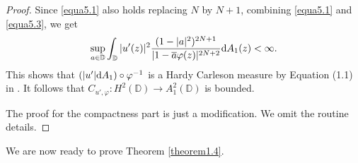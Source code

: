 \documentclass[preprint,12pt,times]{elsarticle}
\theoremstyle{definition}
\theoremstyle{remark}
\numberwithin{equation}{section}
\begin{document}
\begin{proof}
Since \eqref{equa5.1} also holds replacing $N$ by $N+1$, combining \eqref{equa5.1} and \eqref{equa5.3}, we get
\begin{align}\label{equa5.5}
\sup_{a\in\mathbb{D}}\int_{\mathbb{D}}|u'(z)|^2\frac{(1-|a|^2)^{2N+1}}{|1-\overline{a}\varphi(z)|^{2N+2}}{\rm d}A_1(z)<\infty.
\end{align}
This shows that $(|u'|{\rm d}A_1)\circ\varphi^{-1}$ is a Hardy Carleson measure by Equation (1.1) in \cite{25}. It follows that $C_{u',\varphi}: H^2(\mathbb{D})\to A_1^2(\mathbb{D})$ is bounded.

The proof for the compactness part is just a modification. We omit the routine details.
\end{proof}

We are now ready to prove Theorem \ref{theorem1.4}.
\end{document}
